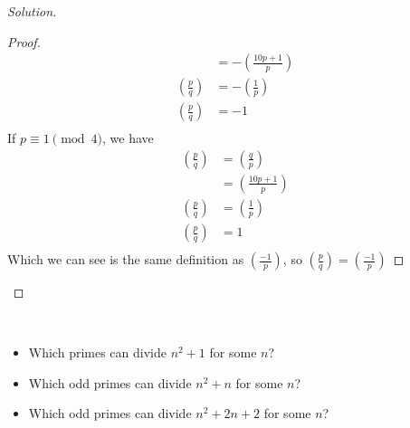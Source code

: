 \documentclass[11pt]{article}
\newcommand\leg[2]{\left(\frac{#1}{#2}\right)}
\newenvironment{problem}[2][Problem]{\begin{trivlist}
\item[\hskip \labelsep {\bfseries #1}\hskip \labelsep {\bfseries #2.}]}{\end{trivlist}}
\newenvironment{solution}
  {\renewcommand\qedsymbol{$~$}\begin{proof}[Solution]$ $\par\nobreak\ignorespaces}
  {\end{proof}}
\begin{document}
\begin{solution}
\begin{itemize}
\begin{proof}
\begin{align*}
                         & = -\leg{10p+1}{p} \\
              \leg{p}{q} & = -\leg{1}{p}     \\
              \leg{p}{q} & = -1              \\
            \end{align*}
            If $p\equiv 1\pmod{4}$, we have
            \begin{align*}
              \leg{p}{q} & = \leg{q}{p}     \\
                         & = \leg{10p+1}{p} \\
              \leg{p}{q} & = \leg{1}{p}     \\
              \leg{p}{q} & = 1              \\
            \end{align*}
            Which we can see is the same definition as $\leg{-1}{p}$, so $\leg{p}{q}=\leg{-1}{p}$
          \end{proof}
  \end{itemize}
  \renewcommand\qedsymbol{$~$}
\end{solution}


\begin{problem}{6}
~\\
\begin{itemize}
  \item [(a)] Which primes can divide $n^2+1$ for some $n$?
  \item [(b)] Which odd primes can divide $n^2+n$ for some $n$?
  \item [(c)] Which odd primes can divide $n^2+2n+2$ for some $n$?
\end{itemize}
\end{problem}
\end{document}
